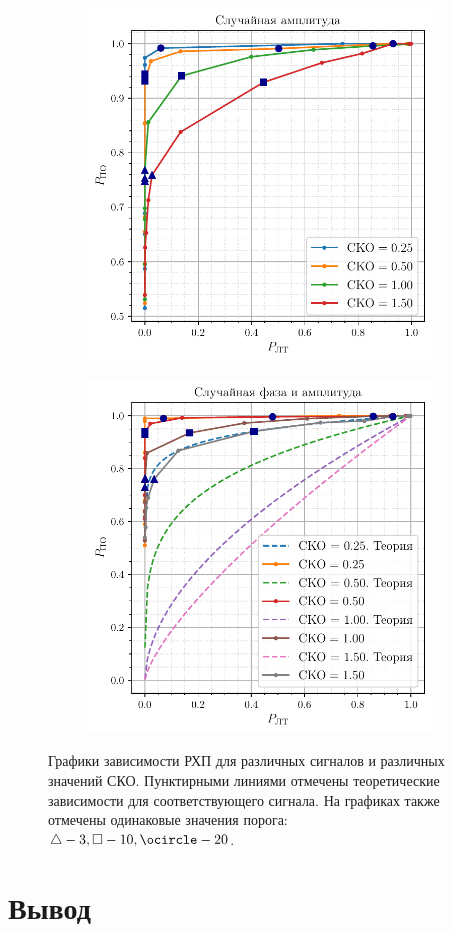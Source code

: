 \begin{figure}[H]
    \centering
    \begin{subfigure}{0.49\linewidth}
	    \includegraphics[width=\linewidth]{data/data_amplitude.pdf}
    \end{subfigure}
    \begin{subfigure}{0.49\linewidth}
	    \includegraphics[width=\linewidth]{data/data_phase_amplitude.pdf}
    \end{subfigure}
    \caption{Графики зависимости РХП для различных сигналов и различных значений СКО. Пунктирными линиями 
    отмечены теоретические зависимости для соответствующего сигнала.
    На графиках также отмечены одинаковые значения порога: $\triangle - 3, \square - 10, \ocircle - 20$.}
    \label{fig:task3}
\end{figure}

\section{Вывод}


